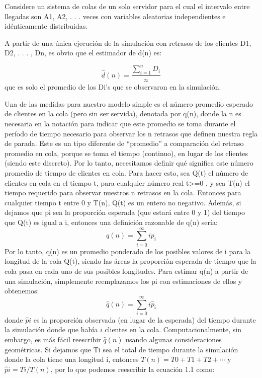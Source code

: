Considere un sistema de colas de un solo servidor para el cual el intervalo entre llegadas son A1, A2, . . . veces con
variables aleatorias independientes e idénticamente distribuidas.

A partir de una única ejecución de la simulación con retrasos de los clientes D1, D2, . . . , Dn, es obvio que el
estimador de d(n) es:

\begin{equation} \label{eq:equation}
\hat{d}(n) = \frac{\sum_{i = 1}^{n}D_{i}}{n}
\end{equation}
que es solo el promedio de los Di's que se observaron en la simulación.

Una de las medidas para nuestro modelo simple es el número promedio esperado de clientes en la cola (pero sin
ser servida), denotada por q(n), donde la n es necesaria en la notación para indicar que este promedio se
toma durante el período de tiempo necesario para observar los n retrasos que definen
nuestra regla de parada.
Este es un tipo diferente de ``promedio'' a comparación del retraso promedio en cola, porque se toma el tiempo
(continuo), en lugar de los clientes (siendo este discreto).
Por lo tanto, necesitamos definir qué significa este número promedio de tiempo de
clientes en cola.
Para hacer esto, sea Q(t) el número de clientes en cola en el tiempo t, para cualquier número real t>=0 ,
y sea T(n) el tiempo requerido para observar nuestros n retrasos en la cola.
Entonces para cualquier tiempo t entre 0 y T(n), Q(t) es un entero no negativo. Además, si dejamos que pi sea la
proporción esperada (que estará entre 0 y 1) del tiempo que Q(t) es igual a i, entonces una definición
razonable de q(n) sería:
 \begin{equation}
   \label{eq:equation2}
q(n) = \sum_{i=0}^{\infty}ip_{i}
 \end{equation}
Por lo tanto, q(n) es un promedio ponderado de los posibles valores de i para la longitud de la cola Q(t),
siendo las áreas la proporción esperada de tiempo que la cola pasa en cada uno de sus posibles longitudes.
Para estimar q(n) a partir de una simulación, simplemente reemplazamos los pi con estimaciones de ellos y
obtenemos:
\begin{equation}
  \label{eq:equation3}
  \hat{q}(n) = \sum_{i=0}^{\infty}i\hat{p}_{i}
\end{equation}
donde $\hat{p}i$ es la proporción observada (en lugar de la esperada) del tiempo durante la simulación
donde que había $i$ clientes en la cola.
Computacionalmente, sin embargo, es más fácil reescribir $\hat{q}(n)$ usando algunas consideraciones geométricas.
Si dejamos que Ti sea el total de tiempo durante la simulación donde la cola tiene una longitud i, entonces
$T(n) = T0 + T1 + T2 + \cdots$ y $\hat{p}i = Ti/T(n)$, por lo que podemos reescribir la ecuación 1.1 como:

